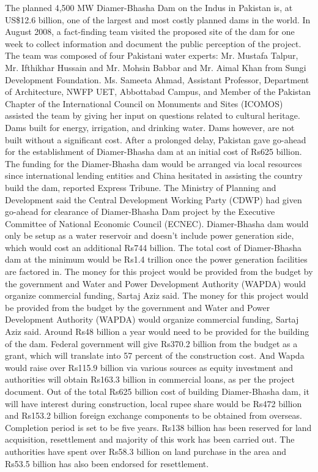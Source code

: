 \documentclass[11pt, journal,letterpaper,compsoc]{IEEEtran}
\begin{document}
The planned 4,500 MW Diamer-Bhasha Dam on the Indus in Pakistan is, at US\$12.6
billion, one of the largest and most costly planned dams in the world. In August 2008,
a fact-finding team visited the proposed site of the dam for one week to collect
information and document the public perception of the project. The team was
composed of four Pakistani water experts: Mr. Mustafa Talpur, Mr. Ifthikhar Hussain
and Mr. Mohsin Babbar and Mr. Aimal Khan from Sungi Development Foundation.
Ms. Sameeta Ahmad, Assistant Professor, Department of Architecture, NWFP UET,
Abbottabad Campus, and Member of the Pakistan Chapter of the International
Council on Monuments and Sites (ICOMOS) assisted the team by giving her input on
questions related to cultural heritage.
Dams built for energy, irrigation, and drinking water. Dams however, are not built without a significant cost. After a prolonged delay, Pakistan gave go-ahead for the establishment of Diamer-Bhasha dam at an initial cost of Rs625 billion.
The funding for the Diamer-Bhasha dam would be arranged via local resources since international lending entities and China hesitated in assisting the country build the dam, reported Express Tribune. The Ministry of Planning and Development said the Central Development Working Party (CDWP) had given go-ahead for clearance of Diamer-Bhasha Dam project by the Executive Committee of National Economic Council (ECNEC). Diamer-Bhasha dam would only be setup as a water reservoir and doesn’t include power generation side, which would cost an additional Rs744 billion. The total cost of Diamer-Bhasha dam at the minimum would be Rs1.4 trillion once the power generation facilities are factored in. The money for this project would be provided from the budget by the government and Water and Power Development Authority (WAPDA) would organize commercial funding, Sartaj Aziz said. The money for this project would be provided from the budget by the government and Water and Power Development Authority (WAPDA) would organize commercial funding, Sartaj Aziz said. Around Rs48 billion a year would need to be provided for the building of the dam. Federal government will give Rs370.2 billion from the budget as a grant, which will translate into 57 percent of the construction cost. And Wapda would raise over Rs115.9 billion via various sources as equity investment and authorities will obtain Rs163.3 billion in commercial loans, as per the project document. Out of the total Rs625 billion cost of building Diamer-Bhasha dam, it will have interest during construction, local rupee share would be Rs472 billion and Rs153.2 billion foreign exchange components to be obtained from overseas. Completion period is set to be five years. Rs138 billion has been reserved for land acquisition, resettlement and majority of this work has been carried out. The authorities have spent over Rs58.3 billion on land purchase in the area and Rs53.5 billion has also been endorsed for resettlement.
\end{document}
